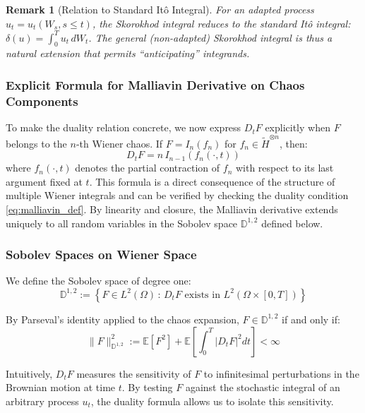 \documentclass[11pt]{article}
\newtheorem{remark}{Remark}
\begin{document}
\begin{remark}[Relation to Standard Itô Integral]
For an adapted process $u_t = u_t(W_s, s \leq t)$, the Skorokhod integral reduces to the standard Itô integral: $\delta(u) = \int_0^T u_t \, dW_t$. The general (non-adapted) Skorokhod integral is thus a natural extension that permits ``anticipating'' integrands.
\end{remark}

\subsubsection{Explicit Formula for Malliavin Derivative on Chaos Components}

To make the duality relation concrete, we now express $D_t F$ explicitly when $F$ belongs to the $n$-th Wiener chaos. If $F = I_n(f_n)$ for $f_n \in \tilde{H}^{\otimes n}$, then:
\begin{equation}
    D_t F = n \, I_{n-1}(f_n(\cdot, t))
\end{equation}
where $f_n(\cdot, t)$ denotes the partial contraction of $f_n$ with respect to its last argument fixed at $t$. This formula is a direct consequence of the structure of multiple Wiener integrals and can be verified by checking the duality condition \eqref{eq:malliavin_def}. By linearity and closure, the Malliavin derivative extends uniquely to all random variables in the Sobolev space $\mathbb{D}^{1,2}$ defined below.

\subsubsection{Sobolev Spaces on Wiener Space}

We define the Sobolev space of degree one:
\begin{equation}
    \mathbb{D}^{1,2} := \left\{ F \in L^2(\Omega) \, : \, D_t F \text{ exists in } 
    L^2(\Omega \times [0,T]) \right\}
\end{equation}

By Parseval's identity applied to the chaos expansion, $F \in \mathbb{D}^{1,2}$ if and only if:
\begin{equation}
    \|F\|_{\mathbb{D}^{1,2}}^2 := \mathbb{E}[F^2] + \mathbb{E}\left[\int_0^T |D_t F|^2 dt\right] < \infty
\end{equation}

\noindent
Intuitively, $D_t F$ measures the sensitivity of $F$ to infinitesimal perturbations in the Brownian motion at time $t$. By testing $F$ against the stochastic integral of an arbitrary process $u_t$, the duality formula allows us to isolate this sensitivity.
\end{document}
